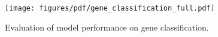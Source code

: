 \begin{figure}[ht]
    \centering
    \texttt{[image: figures/pdf/gene\_classification\_full.pdf]}
    \caption{Evaluation of model performance on gene classification.}
    \label{fig:gene_classification}
\end{figure}